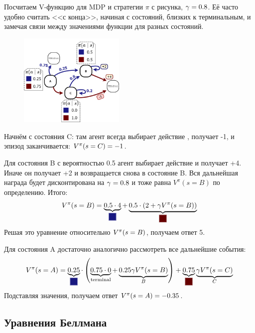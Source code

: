 \begin{exampleBox}[label=ex:vfunction]{}
Посчитаем V-функцию для MDP и стратегии $\pi$ с рисунка, $\gamma \HM= 0.8$. Её часто удобно считать <<с конца>>, начиная с состояний, близких к терминальным, и замечая связи между значениями функции для разных состояний.

\begin{figure}
\vspace{-0.5cm}
\centering
\includegraphics[width=0.45\textwidth]{Images/Value.png}
\vspace{-0.9cm}
\end{figure}

Начнём с состояния C: там агент всегда выбирает действие , получает -1, и эпизод заканчивается: $V^{\pi}(s \HM= C) \HM= -1$.

Для состояния B с вероятностью 0.5 агент выбирает действие  и получает +4. Иначе он получает +2 и возвращается снова в состояние B. Вся дальнейшая награда будет дисконтирована на $\gamma \HM= 0.8$ и тоже равна $V^{\pi}(s = B)$ по определению. Итого:
$$V^{\pi}(s = B) = \underbrace{0.5 \cdot 4}_{\text{\colorsquare{ChadBlue}}} + \underbrace{0.5 \cdot \left(2 + \gamma V^{\pi}(s = B)\right)}_{\text{\colorsquare{ChadRed}}}$$
Решая это уравнение относительно $V^{\pi}(s \HM= B)$, получаем ответ 5.

Для состояния A достаточно аналогично рассмотреть все дальнейшие события:
$$V^{\pi}(s = A) = \underbrace{0.25}_{\text{\colorsquare{ChadBlue}}} \cdot \left(\underbrace{0.75 \cdot 0}_{\text{terminal}} + \underbrace{0.25 \gamma V^{\pi}(s = B)}_{B} \right) + \underbrace{0.75}_{\text{\colorsquare{ChadRed}}} \underbrace{\gamma V^{\pi}(s = C)}_{C}$$
Подставляя значения, получаем ответ $V^{\pi}(s \HM= A) \HM= -0.35$.
\end{exampleBox}

\subsection{Уравнения Беллмана}

